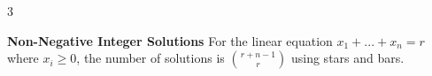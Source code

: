 \documentclass[10pt, landscape]{article}
\begin{document}
\begin{multicols*}{3}

\textbf{Non-Negative Integer Solutions} For the linear equation $x_1+...+x_n=r$ where $x_i\geq 0$, the number of solutions is ${r+n-1 \choose r}$ using stars and bars.


\end{multicols*}
\end{document}
